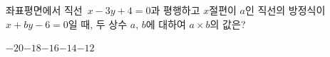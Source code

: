 좌표평면에서 직선~$x-3y+4=0$과 평행하고 $x$절편이 $a$인 직선의 방정식이 $x+by-6=0$일 때, 두 상수 $a$, $b$에 대하여 $a\times b$의 값은?
\begin{choices32}{$-20$}{$-18$}{$-16$}{$-14$}{$-12$}\end{choices32}
